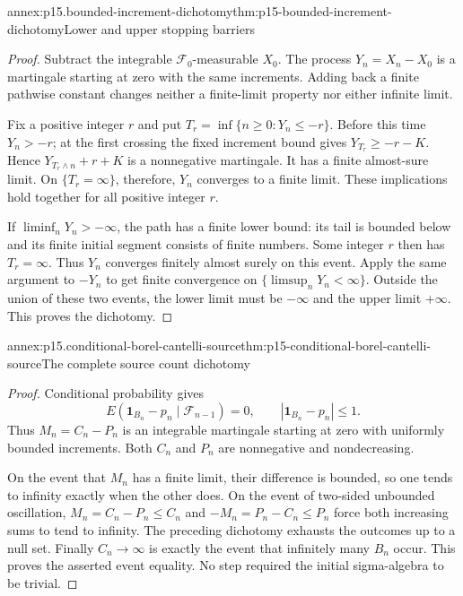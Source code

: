 \begin{annexitem}{annex:p15.bounded-increment-dichotomy}{thm:p15-bounded-increment-dichotomy}{Lower and upper stopping barriers}
\begin{proof}
Subtract the integrable \(\mathcal F_0\)-measurable \(X_0\).
The process \(Y_n=X_n-X_0\) is a martingale starting at zero
with the same increments. Adding back a finite pathwise constant
changes neither a finite-limit property nor either infinite limit.

Fix a positive integer \(r\) and put
\(T_r=\inf\{n\geq0:Y_n\leq-r\}\).
Before this time \(Y_n>-r\); at the first crossing the fixed
increment bound gives \(Y_{T_r}\geq-r-K\).
Hence \(Y_{T_r\wedge n}+r+K\) is a nonnegative martingale.
It has a finite almost-sure limit.
On \(\{T_r=\infty\}\), therefore, \(Y_n\) converges to a finite limit.
These implications hold together for all positive integer \(r\).

If \(\liminf_nY_n>-\infty\), the path has a finite lower bound:
its tail is bounded below and its finite initial segment consists
of finite numbers. Some integer \(r\) then has \(T_r=\infty\).
Thus \(Y_n\) converges finitely almost surely on this event.
Apply the same argument to \(-Y_n\) to get finite convergence
on \(\{\limsup_nY_n<\infty\}\).
Outside the union of these two events, the lower limit must be
\(-\infty\) and the upper limit \(+\infty\).
This proves the dichotomy.
\end{proof}
\end{annexitem}

\begin{annexitem}{annex:p15.conditional-borel-cantelli-source}{thm:p15-conditional-borel-cantelli-source}{The complete source count dichotomy}
\begin{proof}
Conditional probability gives
\[
 E(\mathbf1_{B_n}-p_n\mid\mathcal F_{n-1})=0,\qquad
                    |\mathbf1_{B_n}-p_n|\leq1.
\]
Thus \(M_n=C_n-P_n\) is an integrable martingale starting at zero
with uniformly bounded increments.
Both \(C_n\) and \(P_n\) are nonnegative and nondecreasing.

On the event that \(M_n\) has a finite limit, their difference
is bounded, so one tends to infinity exactly when the other does.
On the event of two-sided unbounded oscillation,
\(M_n=C_n-P_n\leq C_n\) and \(-M_n=P_n-C_n\leq P_n\)
force both increasing sums to tend to infinity.
The preceding dichotomy exhausts the outcomes up to a null set.
Finally \(C_n\to\infty\) is exactly the event that infinitely
many \(B_n\) occur. This proves the asserted event equality.
No step required the initial sigma-algebra to be trivial.
\end{proof}
\end{annexitem}

